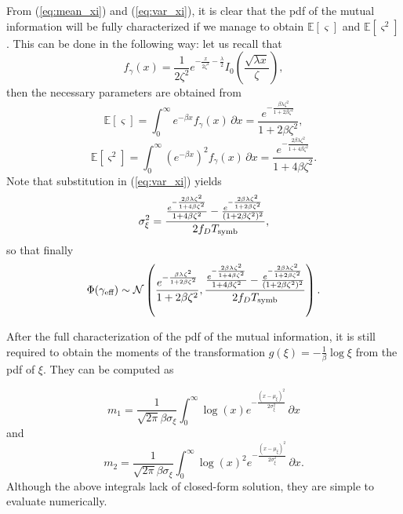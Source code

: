 \documentclass[journal,onecolumn,10pt,a4paper]{IEEEtran}
\def\gammaeff{{\gamma_\textnormal{eff} }}
\newcommand{\ex}{\mathbb{E}}
\begin{document}
From (\ref{eq:mean_xi}) and (\ref{eq:var_xi}), it is clear that the pdf of the mutual information will be fully characterized if we manage to obtain $\ex[\varsigma]$ and $\ex[\varsigma^2]$. This can be done in the following way: let us recall that
\begin{equation}
 f_\gamma(x) = \frac{1}{2\zeta^2}e^{-\frac{x}{2\zeta^2}-\frac{\lambda}{2}}I_0\left(\frac{\sqrt{\lambda x}}{\zeta}\right),
\end{equation}
then the necessary parameters are obtained from
\begin{equation}\label{eq:mean_varsigma}
 \ex[\varsigma] = \int_0^\infty e^{-\beta x}f_\gamma(x)\, \partial x = \frac{e^{-\frac{\beta\lambda\zeta^2}{1+2\beta\zeta^2}}}{1+2\beta\zeta^2},
\end{equation}
\begin{equation}
  \ex[\varsigma^2] = \int_0^\infty \left(e^{-\beta x}\right)^2 f_\gamma(x)\, \partial x = \frac{e^{-\frac{2\beta\lambda\zeta^2}{1+4\beta\zeta^2}}}{1+4\beta\zeta^2}.
\end{equation}
Note that substitution in (\ref{eq:var_xi}) yields
\begin{equation}
 \sigma_\xi^2 = \frac{\frac{e^{-\frac{2\beta\lambda\zeta^2}{1+4\beta\zeta^2}}}{1+4\beta\zeta^2}-\frac{e^{-\frac{2\beta\lambda\zeta^2}{1+2\beta\zeta^2}}}{(1+2\beta\zeta^2)^2}}{2f_DT_{\textnormal{symb}}},
\end{equation}
so that finally
\begin{equation}
 \Phi(\gammaeff)\sim\mathcal{N}\left(\frac{e^{-\frac{\beta\lambda\zeta^2}{1+2\beta\zeta^2}}}{1+2\beta\zeta^2},\frac{\frac{e^{-\frac{2\beta\lambda\zeta^2}{1+4\beta\zeta^2}}}{1+4\beta\zeta^2}-\frac{e^{-\frac{2\beta\lambda\zeta^2}{1+2\beta\zeta^2}}}{(1+2\beta\zeta^2)^2}}{2f_DT_{\textnormal{symb}}}\right).
\end{equation}

After the full characterization of the pdf of the mutual information, it is still required to obtain the moments of the transformation $g(\xi) = -\frac{1}{\beta}\log\xi$ from the pdf of $\xi$. They can be computed as

\begin{equation}
 m_1 = \frac{1}{\sqrt{2\pi}\beta\sigma_\xi}\int_0^\infty\log(x)e^{-\frac{(x-\mu_\xi)^2}{2\sigma_\xi^2}}\,\partial x
\end{equation}
and
\begin{equation}
m_2 = \frac{1}{\sqrt{2\pi}\beta\sigma_\xi}\int_0^\infty\log(x)^2e^{-\frac{(x-\mu_\xi)^2}{2\sigma_\xi^2}}\,\partial x.
\end{equation}
Although the above integrals lack of closed-form solution, they are simple to evaluate numerically.
\end{document}
